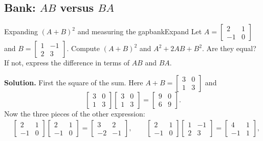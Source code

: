 \documentclass[11pt]{article}
\begin{document}
\subsection*{Bank: $AB$ versus $BA$}

\begin{exmp}{Expanding $(A+B)^2$ and measuring the gap}{bankExpand}
Let $A=\begin{bmatrix}2&1\\-1&0\end{bmatrix}$ and $B=\begin{bmatrix}1&-1\\2&3\end{bmatrix}$. Compute $(A+B)^2$ and $A^2+2AB+B^2$. Are they equal? If not, express the difference in terms of $AB$ and $BA$.

\textbf{Solution.} First the square of the sum. Here $A+B=\begin{bmatrix}3&0\\1&3\end{bmatrix}$ and
\[
\begin{bmatrix}3&0\\1&3\end{bmatrix}\begin{bmatrix}3&0\\1&3\end{bmatrix}=\begin{bmatrix}9&0\\6&9\end{bmatrix}.
\]
Now the three pieces of the other expression:
\begin{align*}
&\begin{bmatrix}2&1\\-1&0\end{bmatrix}\begin{bmatrix}2&1\\-1&0\end{bmatrix}=\begin{bmatrix}3&2\\-2&-1\end{bmatrix},\qquad
\begin{bmatrix}2&1\\-1&0\end{bmatrix}\begin{bmatrix}1&-1\\2&3\end{bmatrix}=\begin{bmatrix}4&1\\-1&1\end{bmatrix},\\

\end{align*}
\end{exmp}
\end{document}
